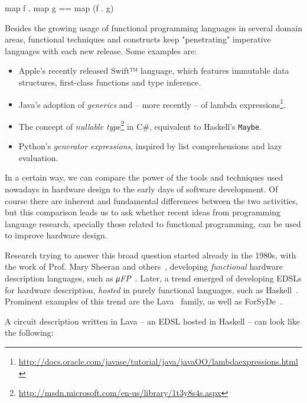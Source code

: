     {\centering
        \begin{haskellcode}
            map f . map g == map (f . g)
        \end{haskellcode}
    }

    Besides the growing usage of functional programming languages in several domain areas,
    functional techniques and constructs keep "penetrating" imperative languages
    with each new release. Some examples are:

    \begin{itemize}
        \item Apple's recently released Swift™ language, which features immutable data structures,
            first-class functions and type inference.
        \item Java's adoption of \emph{generics} and – more recently – of lambda
            expressions\footnote{\url{http://docs.oracle.com/javase/tutorial/java/javaOO/lambdaexpressions.html}}.
        \item The concept of \emph{nullable type}\footnote{\url{http://msdn.microsoft.com/en-us/library/1t3y8s4s.aspx}}
            in C\#, equivalent to Haskell's \texttt{Maybe}.
        \item Python's \emph{generator expressions}, inspired by list comprehensions and lazy evaluation.
    \end{itemize}

    In a certain way, we can compare the power of the tools and techniques
    used nowadays in hardware design to the early days of software development.
    Of course there are inherent and fundamental differences between the two activities, but
    this comparison leads us to ask whether recent ideas from programming language research,
    specially those related to functional programming, can be used to improve hardware design.

    Research trying to answer this broad question started already in the 1980s,
    with the work of Prof. Mary Sheeran and others~\cite{sheeran-survey},
    developing \emph{functional} hardware description languages, such as \emph{μFP}~\cite{mufp-1984}.
    Later, a trend emerged of developing \acp{EDSL} for hardware description,
    \emph{hosted} in purely functional languages, such as Haskell~\cite{haskell2010}.
    Prominent examples of this trend are the Lava~\cite{lava-1999} family,
    as well as ForSyDe~\cite{forsyde1999}.

    A circuit description written in Lava – an \ac{EDSL} hosted in Haskell – can look like the following:

